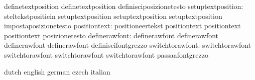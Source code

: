                                   definetextposition               definetextposition
                                  definisciposizionetesto
               setuptextposition: steltekstpositiein               setuptextposition
                                  setuptextposition                setuptextposition
                                  impostaposizionetesto
                    positiontext: positioneertekst                 positiontext
                                  positiontext                     positiontext
                                  posizionetesto                   %
                   definerawfont: definerawfont                    definerawfont
                                  definerawfont                    definerawfont
                                  definiscifontgrezzo
                 switchtorawfont: switchtorawfont                  switchtorawfont
                                  switchtorawfont                  switchtorawfont
                                  passaafontgrezzo
\stopcommands





\startcommands                    dutch                            english
                                  german                           czech
                                  italian

